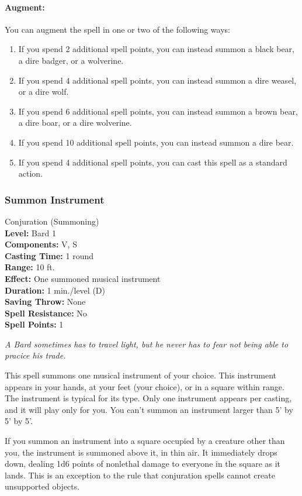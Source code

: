 \paragraph{Augment:} You can augment the spell in one or two of the following ways: 
\begin{enumerate}
 \item If you spend 2 additional spell points, you can instead summon a black bear, a dire badger, or a wolverine.
 \item If you spend 4 additional spell points, you can instead summon a dire weasel, or a dire wolf.
 \item If you spend 6 additional spell points, you can instead summon a brown bear, a dire boar, or a dire wolverine.
 \item If you spend 10 additional spell points, you can instead summon a dire bear.
 \item If you spend 4 additional spell points, you can cast this spell as a standard action.
\end{enumerate}
\subsubsection{Summon Instrument}
\label{Spell:SummonInstrument}
Conjuration (Summoning)
\\ \textbf{Level:} Bard 1
\\ \textbf{Components:} V, S
\\ \textbf{Casting Time:} 1 round
\\ \textbf{Range:} 10 ft.
\\ \textbf{Effect:} One summoned musical instrument
\\ \textbf{Duration:} 1 min./level (D)
\\ \textbf{Saving Throw:} None
\\ \textbf{Spell Resistance:} No
\\ \textbf{Spell Points:} 1

\emph{A Bard sometimes has to travel light, but he never has to fear not being able to pracice his trade.}

This spell summons one musical instrument of your choice. This instrument appears in your hands, at your feet (your choice), or in a square within range. The instrument is typical for its type. Only one instrument appears per casting, and it will play only for you. You can't summon an instrument larger than 5' by 5' by 5'.

If you summon an instrument into a square occupied by a creature other than you, the instrument is summoned above it, in thin air. It immediately drops down, dealing 1d6 points of nonlethal damage to everyone in the square as it lands. This is an exception to the rule that conjuration spells cannot create unsupported objects.

